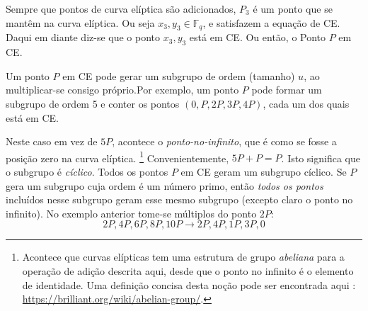 Sempre que pontos de curva elíptica são adicionados, $P_3$ é um ponto que se mantêm na curva elíptica. Ou seja $x_3,y_3 \in \mathbb{F}_q$, e satisfazem a equação de CE. Daqui em diante diz-se que o ponto $x_3,y_3$ está em CE. Ou então, o Ponto $P$ em CE. 

Um ponto $P$ em CE pode gerar um subgrupo de ordem (tamanho) $u$, ao multiplicar-se consigo próprio.\newline Por exemplo, um ponto $P$ pode formar um subgrupo de ordem 5 e conter os pontos $(0, P, 2P, 3P, 4P)$, cada um dos quais está em CE.  

Neste caso em vez de $5P$, acontece o {\em ponto-no-infinito}, que é como se fosse a posição zero na curva elíptica.
\footnote{Acontece que curvas elípticas tem uma estrutura de grupo {\em abeliana} para a operação de adição descrita aqui, desde que o ponto no infinito é o elemento de identidade. Uma definição concisa desta noção pode ser encontrada aqui : \url{https://brilliant.org/wiki/abelian-group/}.}
Convenientemente, $5P + P = P$. Isto significa que o subgrupo é {\em cíclico}.
\newline Todos os pontos $P$ em CE geram um subgrupo cíclico. Se $P$ gera um subgrupo cuja ordem é um número primo, então {\em todos os pontos} incluídos nesse subgrupo geram esse mesmo subgrupo (excepto claro o ponto no infinito).
No exemplo anterior tome-se múltiplos do ponto $2P$:\vspace{.175cm}  
\[2P, 4P, 6P, 8P, 10P \rightarrow 2P, 4P, 1P, 3P, 0\]

